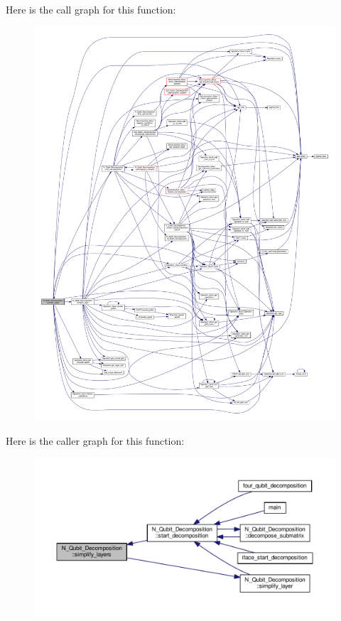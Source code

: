 Here is the call graph for this function\+:
\nopagebreak
\begin{figure}[H]
\begin{center}
\leavevmode
\includegraphics[width=350pt]{class_n___qubit___decomposition_af768a6b3f20e1fd9909271941cf34b6f_cgraph}
\end{center}
\end{figure}




Here is the caller graph for this function\+:
\nopagebreak
\begin{figure}[H]
\begin{center}
\leavevmode
\includegraphics[width=350pt]{class_n___qubit___decomposition_af768a6b3f20e1fd9909271941cf34b6f_icgraph}
\end{center}
\end{figure}


